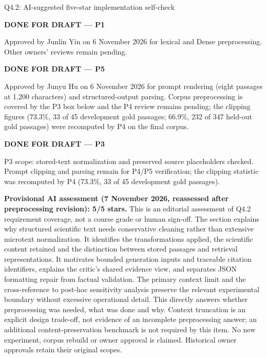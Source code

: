 \begin{review}{Q4.2: AI-suggested five-star implementation self-check}
\colorbox{yellow!45}{\strut\textbf{DONE FOR DRAFT --- P1}}\par
Approved by Junlin Yin on 6 November 2026 for lexical and Dense preprocessing. Other owners' reviews remain pending.\par\smallskip
\colorbox{yellow!45}{\strut\textbf{DONE FOR DRAFT --- P5}}\par
Approved by Junyu Hu on 6 November 2026 for prompt rendering (eight passages at 1,200 characters) and structured-output parsing. Corpus preprocessing is covered by the P3 box below and the P4 review remains pending; the clipping figures (73.3\%, 33 of 45 development gold passages; 66.9\%, 232 of 347 held-out gold passages) were recomputed by P4 on the final corpus.\par\smallskip
\colorbox{yellow!45}{\strut\textbf{DONE FOR DRAFT --- P3}}\par
P3 scope: stored-text normalization and preserved source placeholders checked. Prompt clipping and parsing remain for P4/P5 verification; the clipping statistic was recomputed by P4 (73.3\%, 33 of 45 development gold passages).\par\smallskip
{}\quad\textbf{Provisional AI assessment (7 November 2026, reassessed after preprocessing revision): 5/5 stars.} This is an editorial assessment of Q4.2 requirement coverage, not a course grade or human sign-off. The section explains why structured scientific text needs conservative cleaning rather than extensive microtext normalization. It identifies the transformations applied, the scientific content retained and the distinction between stored passages and retrieval representations. It motivates bounded generation inputs and traceable citation identifiers, explains the critic's shared evidence view, and separates JSON formatting repair from factual validation. The primary context limit and the cross-reference to post-hoc sensitivity analysis preserve the relevant experimental boundary without excessive operational detail. This directly answers whether preprocessing was needed, what was done and why. Context truncation is an explicit design trade-off, not evidence of an incomplete preprocessing answer; an additional content-preservation benchmark is not required by this item. No new experiment, corpus rebuild or owner approval is claimed. Historical owner approvals retain their original scopes.
\end{review}
